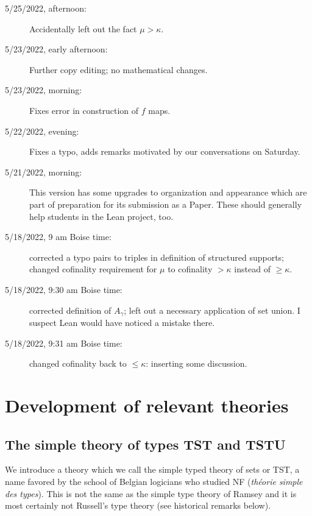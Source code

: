 \documentclass[112pt]{article}
\begin{document}
\begin{description}
\item[5/25/2022, afternoon:]  Accidentally left out the fact $\mu>\kappa$.

\item[5/23/2022, early afternoon:]  Further copy editing;  no mathematical changes.

\item[5/23/2022, morning:]  Fixes error in construction of $f$ maps.

\item[5/22/2022, evening:]  Fixes a typo, adds remarks motivated by our conversations on Saturday.

\item[5/21/2022, morning:]  This version has some upgrades to organization and appearance which are part of preparation for its submission as a Paper.  These should generally help students in the Lean project, too.

\item[5/18/2022, 9 am Boise time:]  corrected a typo pairs to triples in definition of structured supports;  changed cofinality requirement for
$\mu$ to cofinality $>\kappa$ instead of $\geq \kappa$.

\item[5/18/2022, 9:30 am Boise time:]  corrected definition of $A_\gamma$;  left out a necessary application of set union.  I suspect Lean would have noticed a mistake there.

\item[5/18/2022, 9:31 am Boise time:]  changed cofinality back to $\leq \kappa$:  inserting some discussion.

\end{description}


\section{Development of relevant theories}

\subsection{The simple theory of types TST and TSTU}

We introduce a theory which we call the simple typed theory of sets or TST, a name favored by the school of Belgian logicians who studied NF ({\em th\'eorie simple des types}).  This is not the same as the simple type theory of Ramsey and it is most certainly not Russell's type theory  (see historical remarks below).
\end{document}
